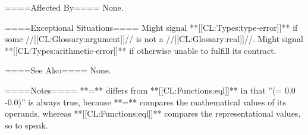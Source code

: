 ====Affected By====
None.

====Exceptional Situations====
Might signal **[[CL:Types:type-error]]** if some //[[CL:Glossary:argument]]// is not a //[[CL:Glossary:real]]//. Might signal **[[CL:Types:arithmetic-error]]** if otherwise unable to fulfill its contract.

====See Also====
None.

====Notes====
**=** differs from **[[CL:Functions:eql]]** in that ''(= 0.0 -0.0)'' is always true, because **=** compares the mathematical values of its operands, whereas **[[CL:Functions:eql]]** compares the representational values, so to speak.

